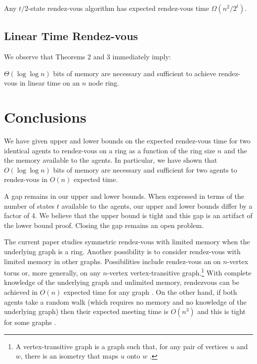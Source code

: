 \documentclass[acmtoalg]{acmtrans2m}
\begin{document}
\begin{thm}
Any $t/2$-state rendez-vous algorithm has expected rendez-vous time
$\Omega(n^2/2^{t})$.
\end{thm}

\subsection{Linear Time Rendez-vous}

We observe that Theorems 2 and 3 immediately imply:

\begin{thm}
$\Theta( \log \log n)$ bits of memory are necessary and sufficient to 
achieve rendez-vous in linear time on an $n$ node ring.
\end{thm}

\section{Conclusions}

We have given upper and lower bounds on the expected rendez-vous time
for two identical agents to rendez-vous on a ring as a function of the
ring size $n$ and the the memory available to the agents.  In
particular, we have shown that $O(\log\log n)$ bits of memory are
necessary and sufficient for two agents to rendez-vous in $O(n)$
expected time.

A gap remains in our upper and lower bounds.  When expressed in terms
of the number of states $t$ available to the agents, our upper and
lower bounds differ by a factor of 4.  We believe that the upper bound
is tight and this gap is an artifact of the lower bound proof.
Closing the gap remains an open problem.

The current paper studies symmetric rendez-vous with limited memory
when the underlying graph is a ring. Another possibility is to consider
rendez-vous with limited memory in other graphs.  Possibilities include
rendez-vous an on $n$-vertex torus or, more generally, on any $n$-vertex
vertex-transitive graph.\footnote{A vertex-transitive graph is a graph
such that, for any pair of vertices $u$ and $w$, there is an isometry that
maps $u$ onto $w$ \cite[Chapter~15]{alpernGal03}.} With complete knowledge
of the underlying graph and unlimited memory, rendezvous can be achieved
in $O(n)$ expected time for any graph \cite[Section~15.2]{alpernGal03}.
On the other hand, if both agents take a random walk (which requires
no memory and no knowledge of the underlying graph) then their
expected meeting time is $O(n^3)$ and this is tight for some graphs
\cite{coppersmith}.
\end{document}
